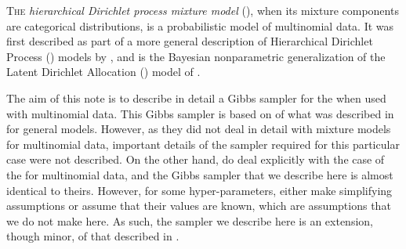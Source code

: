 \lettrine[lines=3,findent=1pt]%
{T}{he} \emph{hierarchical Dirichlet process mixture model} (\hdpmm), when its
mixture components are categorical distributions, is a probabilistic model of
multinomial data. It was first described as part of a more general description
of Hierarchical Dirichlet Process (\hdp) models by ,
and is the Bayesian nonparametric generalization of the Latent Dirichlet
Allocation (\lda) model of .  

The aim of this note is to describe in detail a Gibbs sampler for the
\hdpmm when used with multinomial data. This Gibbs sampler is based on of what
was described in  for general \hdp models. However,
as they did not deal in detail with \hdp mixture models for multinomial data,
important details of the sampler required for this particular case were not
described.  On the other hand,  do deal explicitly
with the case of the \hdpmm for multinomial data, and the Gibbs sampler that we
describe here is almost identical to theirs. However, for some
hyper-parameters,  either make simplifying
assumptions or assume that their values are known, which are assumptions that
we do not make here. As such, the sampler we describe here is an extension,
though minor, of that described in .
